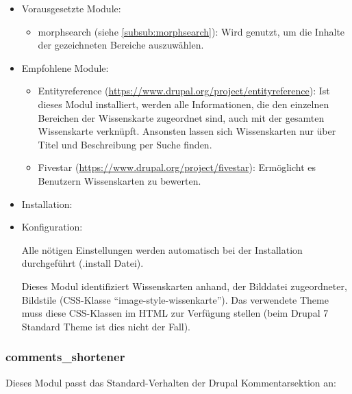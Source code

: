 \begin{itemize}[parsep=0pt, itemsep=5.0pt plus 2.0pt minus 1.0pt, leftmargin=*]
	\item Vorausgesetzte Module:

	\begin{itemize}
		\item morphsearch (siehe \cref{subsub:morphsearch}): Wird genutzt, um die Inhalte der gezeichneten Bereiche auszuwählen.
	\end{itemize}


	\item Empfohlene Module:

	\begin{itemize}
		\item Entityreference (\url{https://www.drupal.org/project/entityreference}): Ist dieses Modul installiert, werden alle Informationen, die den einzelnen Bereichen der Wissenskarte zugeordnet sind, auch mit der gesamten Wissenskarte verknüpft. Ansonsten lassen sich Wissenskarten nur über Titel und Beschreibung per Suche finden.

		\item Fivestar (\url{https://www.drupal.org/project/fivestar}): Ermöglicht es Benutzern Wissenskarten zu bewerten.
	\end{itemize}


	\item Installation: \standardinstall


	\item Konfiguration:

	\noconfig

	Alle nötigen Einstellungen werden automatisch bei der Installation durchgeführt (.install Datei).

	Dieses Modul identifiziert Wissenskarten anhand, der Bilddatei zugeordneter, Bildstile (\zB CSS-Klasse \enquote{image-style-wissenkarte}). Das verwendete Theme muss diese CSS-Klassen im HTML zur Verfügung stellen (beim Drupal 7 Standard Theme ist dies nicht der Fall).
\end{itemize}



\subsubsection{comments\_shortener}\label{subsub:commentsshortener}
Dieses Modul passt das Standard-Verhalten der Drupal Kommentarsektion an:

